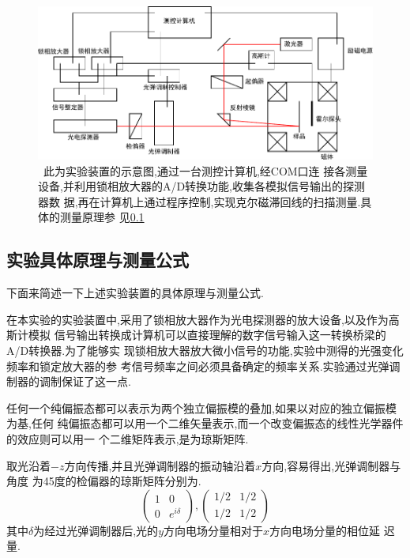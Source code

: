 \documentclass[aps,pre,12pt,preprint,onecolumn,showpacs,showkeys]{revtex4-1}
\begin{document}
\begin{figure}[htbp]
    \centering
    \includegraphics[width=\textwidth]{inst.pdf}
    \caption{\label{fig:inst}~此为实验装置的示意图,通过一台测控计算机,经COM口连
        接各测量设备,并利用锁相放大器的A/D转换功能,收集各模拟信号输出的探测器数
        据,再在计算机上通过程序控制,实现克尔磁滞回线的扫描测量.具体的测量原理参
        见\ref{sec:prin}}
\end{figure}

\subsection{实验具体原理与测量公式}

\label{sec:prin}

下面来简述一下上述实验装置的具体原理与测量公式.

在本实验的实验装置中,采用了锁相放大器作为光电探测器的放大设备,以及作为高斯计模拟
信号输出转换成计算机可以直接理解的数字信号输入这一转换桥梁的A/D转换器.为了能够实
现锁相放大器放大微小信号的功能,实验中测得的光强变化频率和锁定放大器的参
考信号频率之间必须具备确定的频率关系.实验通过光弹调制器的调制保证了这一点.

任何一个纯偏振态都可以表示为两个独立偏振模的叠加,如果以对应的独立偏振模为基,任何
纯偏振态都可以用一个二维矢量表示,而一个改变偏振态的线性光学器件的效应则可以用一
个二维矩阵表示,是为琼斯矩阵.

取光沿着$-z$方向传播,并且光弹调制器的振动轴沿着$x$方向,容易得出,光弹调制器与角度
为45度的检偏器的琼斯矩阵分别为.
\begin{equation}
    \begin{pmatrix}
        1 & 0 \\
        0 & e^{i\delta}
    \end{pmatrix} ,
    \begin{pmatrix}
        1/2 & 1/2 \\
        1/2 & 1/2
    \end{pmatrix}
\end{equation}
其中$\delta$为经过光弹调制器后,光的$y$方向电场分量相对于$x$方向电场分量的相位延
迟量.
\end{document}
